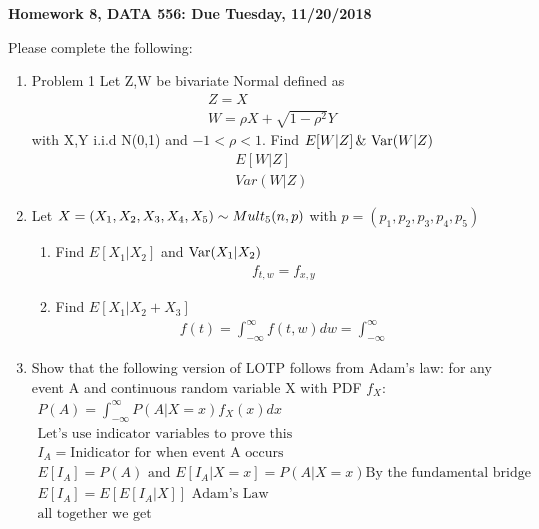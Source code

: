 \documentclass[11pt]{article}
\newcommand{\Var}{\mathop{\rm Var}}
\begin{document}
\begin{title}
	{\Large\bf Homework 8, DATA 556: Due Tuesday, 11/20/2018}
\end{title}

\author{\bf Alexander Van Roijen}

\maketitle

\newpage
Please complete the following:
\begin{enumerate}
\item Problem 1
Let Z,W be bivariate Normal defined as
\begin{gather}
	Z=X\\
	W=\rho X + \sqrt{1-\rho^2}Y
\end{gather}
with X,Y i.i.d N(0,1) and $-1<\rho<1$. Find $E[W|Z] \, \& \, \Var(W|Z)$
\begin{gather}
	E[W|Z] 
	\\
	Var(W|Z)
\end{gather}
\item Let $X = (X_1,X_2,X_3,X_4,X_5) \sim Mult_5(n,\boldmath{p})$ with $p = (p_1,p_2,p_3,p_4,p_5)$
\begin{enumerate}
	\item Find $E[X_1|X_2]$ and $\Var(X_1|X_2)$
	\begin{gather}
		f_{t,w}=f_{x,y}
	\end{gather}
	\item Find $E[X_1|X_2+X_3]$ 
	\begin{gather}
		f(t) = \int_{-\infty}^{\infty} f(t,w) dw = \int_{-\infty}^{\infty}
	\end{gather}
\end{enumerate}
\item Show that the following version of LOTP follows from Adam’s law: for any event A and continuous random variable X with PDF $f_X$:
\begin{gather}
	P(A) = \int_{-\infty}^{\infty}P(A|X=x)f_X(x)dx\\
	\text{Let's use indicator variables to prove this}\\
	I_A = \text{Inidicator for when event A occurs}\\
	E[I_A] = P(A) \text{ and } E[I_A|X=x]=P(A|X=x) \text{By the fundamental bridge} \\ 
	E[I_A] = E[E[I_A|X]] \text{ Adam's Law}\\
	\text{all together we get }\\

\end{gather}
\end{enumerate}
\end{document}

